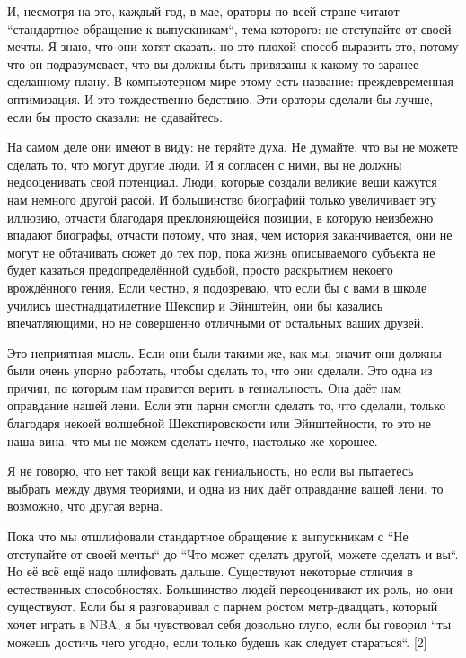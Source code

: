 \documentclass[ebook,12pt,oneside,openany]{memoir}
\begin{document}
И, несмотря на это, каждый год, в мае, ораторы по всей стране читают
``стандартное обращение к выпускникам``, тема которого: не отступайте от
своей мечты. Я знаю, что они хотят сказать, но это плохой способ
выразить это, потому что он подразумевает, что вы должны быть
привязаны к какому-то заранее сделанному плану. В компьютерном мире
этому есть название: преждевременная оптимизация. И это тождественно
бедствию. Эти ораторы сделали бы лучше, если бы просто сказали: не
сдавайтесь. \newline

На самом деле они имеют в виду: не теряйте духа. Не думайте, что вы не
можете сделать то, что могут другие люди. И я согласен с ними, вы не
должны недооценивать свой потенциал. Люди, которые создали великие
вещи кажутся нам немного другой расой. И большинство биографий только
увеличивает эту иллюзию, отчасти благодаря преклоняющейся позиции, в
которую неизбежно впадают биографы, отчасти потому, что зная, чем
история заканчивается, они не могут не обтачивать сюжет до тех пор,
пока жизнь описываемого субъекта не будет казаться предопределённой
судьбой, просто раскрытием некоего врождённого гения. Если честно, я
подозреваю, что если бы с вами в школе учились шестнадцатилетние
Шекспир и Эйнштейн, они бы казались впечатляющими, но не совершенно
отличными от остальных ваших друзей. \newline

Это неприятная мысль. Если они были такими же, как мы, значит они
должны были очень упорно работать, чтобы сделать то, что они сделали.
Это одна из причин, по которым нам нравится верить в гениальность. Она
даёт нам оправдание нашей лени. Если эти парни смогли сделать то, что
сделали, только благодаря некоей волшебной Шекспировскости или
Эйнштейности, то это не наша вина, что мы не можем сделать нечто,
настолько же хорошее. \newline

Я не говорю, что нет такой вещи как гениальность, но если вы пытаетесь
выбрать между двумя теориями, и одна из них даёт оправдание вашей
лени, то возможно, что другая верна. \newline

Пока что мы отшлифовали стандартное обращение к выпускникам с ``Не
отступайте от своей мечты`` до ``Что может сделать другой, можете
сделать и вы``. Но её всё ещё надо шлифовать дальше. Существуют
некоторые отличия в естественных способностях. Большинство людей
переоценивают их роль, но они существуют. Если бы я разговаривал с
парнем ростом метр-двадцать, который хочет играть в NBA, я бы
чувствовал себя довольно глупо, если бы говорил ``ты можешь достичь
чего угодно, если только будешь как следует стараться``. [2] \newline
\end{document}
